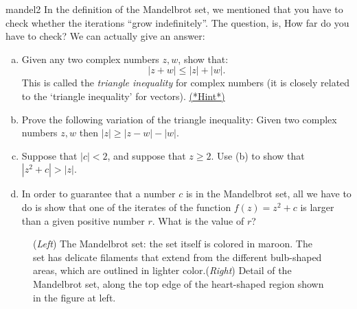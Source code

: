 \begin{exercise}{mandel2}
In the definition of the Mandelbrot set, we mentioned that you have to check whether the iterations ``grow indefinitely''. The question, is, How far do you have to check? We can actually give an answer:
\begin{enumerate}[(a)]
\item
Given any two complex numbers $z,w$, show that:
\begin{equation*}
|z + w| \le |z| + |w|.
\end{equation*}
This is called the \emph{triangle inequality} for complex numbers (it is closely related to the `triangle inequality' for vectors). \hyperref[sec:complex:hints]{(*Hint*)}
\item
Prove the following variation of the triangle inequality:  Given two complex numbers $z,w$ then $|z| \ge |z-w| - |w|$.
\item
Suppose that $|c| < 2$, and suppose that $z \ge 2$. Use (b) to show  that $|z^2 + c| > |z|$.
\item
In order to guarantee that a number $c$ is in the Mandelbrot set, all we have to do is show that one of the iterates of the function $f(z) = z^2 + c$ is larger than a given positive number $r$.  What is the value of $r$?  
\end{enumerate}
\end{exercise}

\begin{figure}[hbt]  
\caption{(\emph{Left}) The Mandelbrot set: the set itself is colored in maroon. The  set has delicate filaments that extend from the different bulb-shaped areas, which are outlined in lighter color.(\emph{Right}) Detail of the Mandelbrot set, along the top edge of the heart-shaped region shown in the figure at left. \label{mandelbrot}}
\end{figure}


